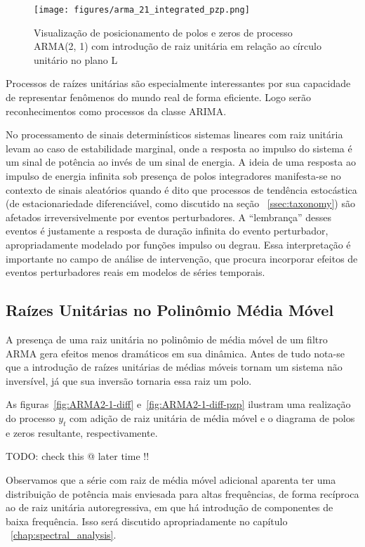 \begin{figure}[H]
    \centering
    \texttt{[image: figures/arma\_21\_integrated\_pzp.png]}
    \caption{Visualização de posicionamento de polos e zeros de processo
    ARMA(2, 1) com introdução de raiz unitária em relação ao
    círculo unitário no plano L}
    \label{fig:ARMA2-1-integrated-pzp}
\end{figure}

Processos de raízes unitárias são especialmente interessantes por sua
capacidade de representar fenômenos do mundo real de forma eficiente. Logo
serão reconhecimentos como processos da classe ARIMA.

No processamento de sinais determinísticos sistemas lineares com raiz unitária
levam ao caso de estabilidade marginal, onde a resposta ao impulso do sistema é
um sinal de potência ao invés de um sinal de energia. A ideia de uma resposta
ao impulso de energia infinita sob presença de polos integradores manifesta-se
no contexto de sinais aleatórios quando é dito que processos de tendência
estocástica (de estacionariedade diferenciável, como discutido na seção
~\ref{ssec:taxonomy}) são afetados irreversivelmente por eventos perturbadores.
A ``lembrança'' desses eventos é justamente a resposta de duração infinita do
evento perturbador, apropriadamente modelado por funções impulso ou degrau.
Essa interpretação é importante no campo de análise de intervenção, que procura
incorporar efeitos de eventos perturbadores reais em modelos de séries
temporais.

\subsection{Raízes Unitárias no Polinômio Média Móvel}\label{ssec:ma_roots}

A presença de uma raiz unitária no polinômio de média móvel de um filtro ARMA
gera efeitos menos dramáticos em sua dinâmica. Antes de tudo nota-se que a
introdução de raízes unitárias de médias móveis tornam um sistema não
inversível, já que sua inversão  tornaria essa raiz um polo.

As figuras~\ref{fig:ARMA2-1-diff} e~\ref{fig:ARMA2-1-diff-pzp} ilustram uma
realização do processo $y_t$ com adição de raiz unitária de média móvel e o
diagrama de polos e zeros resultante, respectivamente.

TODO: check this @ later time !!

Observamos que a série com raiz de média móvel adicional aparenta ter uma
distribuição de potência mais enviesada para altas frequências, de forma
recíproca ao de raiz unitária autoregressiva, em que há introdução de
componentes de baixa frequência. Isso será discutido apropriadamente no
capítulo ~\ref{chap:spectral_analysis}.


